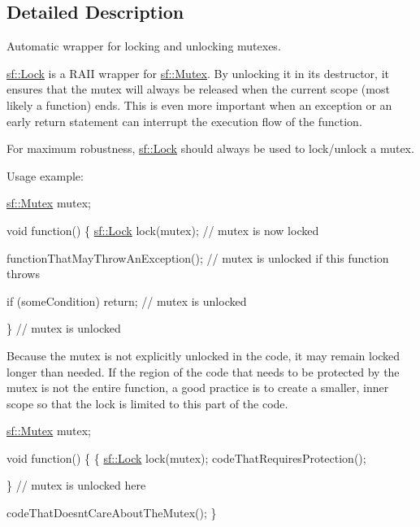 \subsection{Detailed Description}
Automatic wrapper for locking and unlocking mutexes. 

\hyperlink{classsf_1_1_lock}{sf\-::\-Lock} is a R\-A\-I\-I wrapper for \hyperlink{classsf_1_1_mutex}{sf\-::\-Mutex}. By unlocking it in its destructor, it ensures that the mutex will always be released when the current scope (most likely a function) ends. This is even more important when an exception or an early return statement can interrupt the execution flow of the function.

For maximum robustness, \hyperlink{classsf_1_1_lock}{sf\-::\-Lock} should always be used to lock/unlock a mutex.

Usage example\-: 
\begin{DoxyCode}
\hyperlink{classsf_1_1_mutex}{sf::Mutex} mutex;

\textcolor{keywordtype}{void} \textcolor{keyword}{function}()
\{
    \hyperlink{classsf_1_1_lock}{sf::Lock} lock(mutex); \textcolor{comment}{// mutex is now locked}

    functionThatMayThrowAnException(); \textcolor{comment}{// mutex is unlocked if this function throws}

    \textcolor{keywordflow}{if} (someCondition)
        \textcolor{keywordflow}{return}; \textcolor{comment}{// mutex is unlocked}

\} \textcolor{comment}{// mutex is unlocked}
\end{DoxyCode}


Because the mutex is not explicitly unlocked in the code, it may remain locked longer than needed. If the region of the code that needs to be protected by the mutex is not the entire function, a good practice is to create a smaller, inner scope so that the lock is limited to this part of the code.


\begin{DoxyCode}
\hyperlink{classsf_1_1_mutex}{sf::Mutex} mutex;

\textcolor{keywordtype}{void} \textcolor{keyword}{function}()
\{
    \{
      \hyperlink{classsf_1_1_lock}{sf::Lock} lock(mutex);
      codeThatRequiresProtection();

    \} \textcolor{comment}{// mutex is unlocked here}

    codeThatDoesntCareAboutTheMutex();
\}
\end{DoxyCode}



